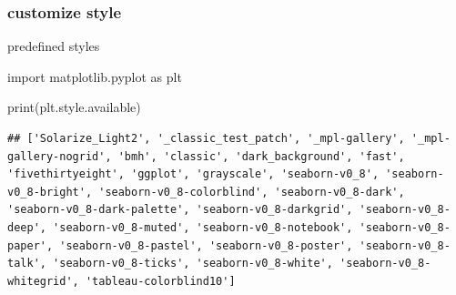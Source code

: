 \documentclass[
]{book}
\newenvironment{Shaded}{\begin{snugshade}}{\end{snugshade}}
\newcommand{\BuiltInTok}[1]{#1}
\newcommand{\ImportTok}[1]{#1}
\newcommand{\NormalTok}[1]{#1}
\theoremstyle{definition}
\theoremstyle{definition}
\theoremstyle{definition}
\theoremstyle{definition}
\theoremstyle{remark}
\begin{document}
\subsubsection{customize style}\label{customize-style}

predefined styles

\begin{Shaded}
\begin{Highlighting}[]
\ImportTok{import}\NormalTok{ matplotlib.pyplot }\ImportTok{as}\NormalTok{ plt}

\BuiltInTok{print}\NormalTok{(plt.style.available)}
\end{Highlighting}
\end{Shaded}

\begin{verbatim}
## ['Solarize_Light2', '_classic_test_patch', '_mpl-gallery', '_mpl-gallery-nogrid', 'bmh', 'classic', 'dark_background', 'fast', 'fivethirtyeight', 'ggplot', 'grayscale', 'seaborn-v0_8', 'seaborn-v0_8-bright', 'seaborn-v0_8-colorblind', 'seaborn-v0_8-dark', 'seaborn-v0_8-dark-palette', 'seaborn-v0_8-darkgrid', 'seaborn-v0_8-deep', 'seaborn-v0_8-muted', 'seaborn-v0_8-notebook', 'seaborn-v0_8-paper', 'seaborn-v0_8-pastel', 'seaborn-v0_8-poster', 'seaborn-v0_8-talk', 'seaborn-v0_8-ticks', 'seaborn-v0_8-white', 'seaborn-v0_8-whitegrid', 'tableau-colorblind10']
\end{verbatim}
\end{document}

